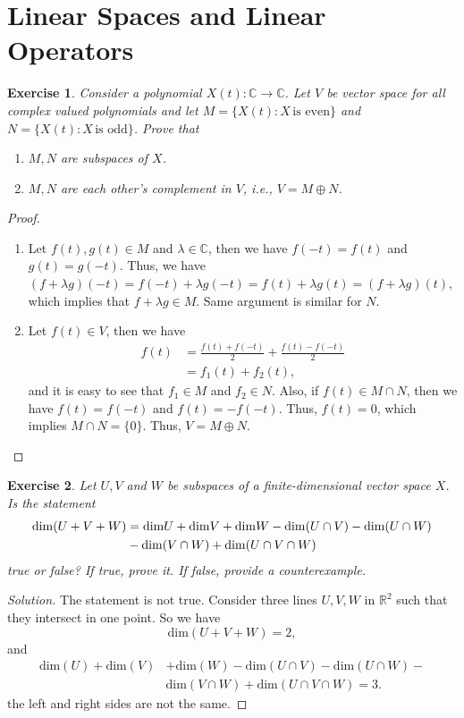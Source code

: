 \documentclass[11pt]{book}
\newtheorem{exercise}{Exercise}[section]
\theoremstyle{definition}
\numberwithin{equation}{chapter}
\begin{document}
\section{Linear Spaces and Linear Operators}
\begin{exercise}\label{ex_1}
Consider a polynomial $X(t):\mathbb{C}\to\mathbb{C}$. Let $V$ be vector space for all complex valued polynomials and let $M = \{X(t): X \,\text{is even}\}$ and $N = \{X(t): X \,\text{is odd}\}$. Prove that 
\begin{enumerate}[label=(\alph*)]
    \item $M,N$ are subspaces of $X$.
    \item $M, N$ are each other's complement in $V$, i.e., $V = M\oplus N$.
\end{enumerate}
\end{exercise}
\begin{proof}
~\begin{enumerate}[label=(\alph*)]
    \item Let $f(t), g(t)\in M$ and $\lambda\in\mathbb{C}$, then we have $f(-t) = f(t)$ and $g(t) = g(-t)$. Thus, we have $(f+\lambda g)(-t) = f(-t) + \lambda g(-t) = f(t) + \lambda g(t) = (f+\lambda g)(t)$, which implies that $f+\lambda g\in M$. Same argument is similar for $N$.
    \item Let $f(t)\in V$, then we have 
    \begin{align*}
        f(t) & = \frac{f(t) + f(-t)}{2} + \frac{f(t) - f(-t)}{2} \\
        & = f_1(t) + f_2(t),
    \end{align*}
    and it is easy to see that $f_1\in M$ and $f_2\in N$. Also, if $f(t)\in M\cap N$, then we have $f(t) = f(-t)$ and $f(t) = -f(-t)$. Thus, $f(t) = 0$, which implies $M\cap N = \{0\}$. Thus, $V = M\oplus N$.
\end{enumerate}
\end{proof}

\medskip

\begin{exercise}\label{ex_2}
Let $U, V$ and $W$ be subspaces of a finite-dimensional vector space $X$. Is the statement
\begin{align*}
    {\rm dim}(U + V + W) & = {\rm dim} U + {\rm dim} V + {\rm dim} W - {\rm dim}(U \cap V) - {\rm dim}(U \cap W) \\
    & - {\rm dim}(V \cap W) + {\rm dim}(U \cap V \cap W)
\end{align*}
true or false? If true, prove it. If false, provide a counterexample.
\end{exercise}
\begin{proof}[Solution]
The statement is not true. Consider three lines $U,V,W$ in $\mathbb{R}^2$ such that they intersect in one point. So we have
$$\text{dim} (U+V+W) = 2,$$
and
\begin{align*}
   \text{dim}(U) + \text{dim}(V) & + \text{dim}(W) - \text{dim}(U \cap V) - \text{dim}(U \cap W) - \\
   & \text{dim}(V \cap W) + \text{dim}(U \cap V \cap W) = 3.
\end{align*}
the left and right sides are not the same. 
\end{proof}
\end{document}
